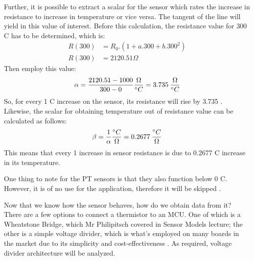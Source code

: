 Further, it is possible to extract a scalar for the sensor which rates the increase in resistance to increase in temperature or vice versa. The tangent of the line will yield in this value of interest. Before this calculation, the resistance value for 300 \degree C has to be determined, which is:
\begin{align}
    R(300) &= R_0.(1 + a.300 + b.300^2)\\
    R(300) &= 2120.51 \Omega
\end{align}
Then employ this value:
\begin{equation}
    \alpha = \frac{2120.51 - 1000}{300 - 0} \frac{\ohm}{\degree C} = 3.735 \:  \frac{\ohm}{\degree C}
\end{equation}
So, for every 1 \degree C increase on the sensor, its resistance will rise by 3.735 \ohm. Likewise, the scalar for obtaining temperature out of resistance value can be calculated as follows:
\begin{equation}
    \beta = \frac{1}{\alpha} \frac{\degree C}{\ohm} = 0.2677 \:  \frac{\degree C}{\ohm}
\end{equation}
This means that every 1 \ohm \: increase in sensor resistance is due to 0.2677 \degree C increase in its temperature.

One thing to note for the PT sensors is that they also function below 0 \degree C. However, it is of no use for the application, therefore it will be skipped \cite{Pt1000}.

Now that we know how the sensor behaves, how do we obtain data from it? There are a few options to connect a thermistor to an MCU. One of which is a Wheatstone Bridge, which Mr Philipitsch covered in Sensor Models lecture; the other is a simple voltage divider, which is what's employed on many boards in the market due to its simplicity and cost-effectiveness \cite{mksboard}. As required, voltage divider architecture will be analyzed.


